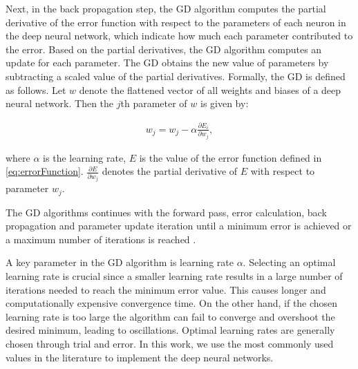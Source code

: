\documentclass[conference]{IEEEtran}
\begin{document}
Next, in the back propagation step, the GD algorithm 
computes the partial derivative of the error function with respect to the
parameters of each neuron in the deep neural network, which indicate how much each parameter contributed to
the error. Based on the partial derivatives, the GD algorithm computes an update for each parameter. 
The GD  obtains the new value of parameters by subtracting a scaled value of the partial derivatives. Formally, the GD is defined as follows.  Let $w$ denote the flattened vector of all weights and biases of a deep neural
network. Then the $j$th parameter of $w$ is given by:

\begin{align}\label{eq:GD}
w_j = w_j -\alpha \frac{\partial E_i}{\partial w_j}, 
\end{align}

where $\alpha$ is the learning rate,  $E$ is the value of the error function defined in \ref{eq:errorFunction}. $\frac{\partial E}{\partial w_j}$ denotes the partial derivative of $E$ with respect to parameter $w_j$.   

The GD algorithms continues with the forward pass, error calculation, back propagation and parameter update iteration until a minimum
error is achieved or a maximum number of iterations is reached \cite{ruder2016overview}. 

A key parameter in the GD algorithm is learning rate $\alpha$.   Selecting an optimal learning
rate is crucial since a smaller learning rate results in a large number of iterations needed to reach the minimum error value. This
causes longer and computationally expensive convergence time. On the other hand, if the chosen learning rate is too large the algorithm
can fail to converge and overshoot the desired minimum, leading to oscillations.  Optimal learning rates are generally chosen through
trial and error. In this work, we use the most commonly used values in the literature to implement the deep neural networks. 
\end{document}

